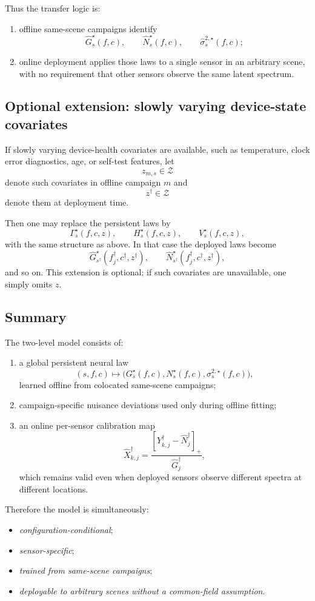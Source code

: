 Thus the transfer logic is:

\begin{enumerate}
    \item offline same-scene campaigns identify
    \[
    \widehat G_s^\star(f,c),\qquad
    \widehat N_s^\star(f,c),\qquad
    \widehat \sigma_s^{2,\star}(f,c);
    \]
    \item online deployment applies those laws to a single sensor in an
    arbitrary scene, with no requirement that other sensors observe the same
    latent spectrum.
\end{enumerate}

\subsection{Optional extension: slowly varying device-state covariates}

If slowly varying device-health covariates are available, such as temperature,
clock error diagnostics, age, or self-test features, let
\[
z_{m,s}\in\mathcal Z
\]
denote such covariates in offline campaign $m$ and
\[
z^\dagger\in\mathcal Z
\]
denote them at deployment time.

Then one may replace the persistent laws by
\[
\Gamma_s^\star(f,c,z),\qquad
H_s^\star(f,c,z),\qquad
V_s^\star(f,c,z),
\]
with the same structure as above. In that case the deployed laws become
\[
\widehat G_{s^\dagger}^\star(f^\dagger_j,c^\dagger,z^\dagger),\qquad
\widehat N_{s^\dagger}^\star(f^\dagger_j,c^\dagger,z^\dagger),
\]
and so on. This extension is optional; if such covariates are unavailable, one
simply omits $z$.

\subsection{Summary}

The two-level model consists of:

\begin{enumerate}
    \item a global persistent neural law
    \[
    (s,f,c)\mapsto
    \bigl(
    G_s^\star(f,c),
    N_s^\star(f,c),
    \sigma_s^{2,\star}(f,c)
    \bigr),
    \]
    learned offline from colocated same-scene campaigns;
    \item campaign-specific nuisance deviations used only during offline
    fitting;
    \item an online per-sensor calibration map
    \[
    \widehat X^\dagger_{k,j}
    =
    \frac{
    [Y^\dagger_{k,j}-\widehat N^\dagger_j]_+
    }{
    \widehat G^\dagger_j
    },
    \]
    which remains valid even when deployed sensors observe different spectra
    at different locations.
\end{enumerate}

Therefore the model is simultaneously:
\begin{itemize}
    \item \emph{configuration-conditional};
    \item \emph{sensor-specific};
    \item \emph{trained from same-scene campaigns};
    \item \emph{deployable to arbitrary scenes without a common-field assumption}.
\end{itemize}
